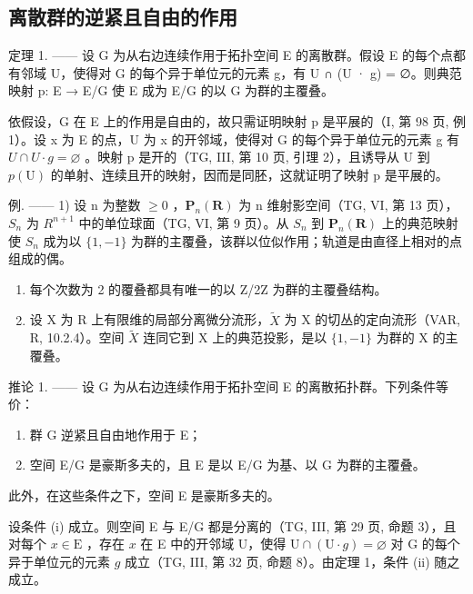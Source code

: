 \subsection{离散群的逆紧且自由的作用}

定理 1. —— 设 G 为从右边连续作用于拓扑空间 E 的离散群。假设 E 的每个点都有邻域 U，使得对 G 的每个异于单位元的元素 g，有 U ∩ (U · g) = ∅。则典范映射 p: E → E/G 使 E 成为 E/G 的以 G 为群的主覆叠。

依假设，G 在 E 上的作用是自由的，故只需证明映射 p 是平展的（I, 第 98 页, 例 1）。设 x 为 E 的点，U 为 x 的开邻域，使得对 G 的每个异于单位元的元素 g 有 \(U \cap U \cdot g = \varnothing\) 。映射 p 是开的（TG, III, 第 10 页, 引理 2），且诱导从 U 到 \(p(\mathrm{U})\) 的单射、连续且开的映射，因而是同胚，这就证明了映射 p 是平展的。

例. —— 1) 设 n 为整数 \(\geqslant 0\) ，\(\mathbf{P}_{n}(\mathbf{R})\) 为 n 维射影空间（TG, VI, 第 13 页），\(S_{n}\) 为 \(R^{n+1}\) 中的单位球面（TG, VI, 第 9 页）。从 \(S_{n}\) 到 \(\mathbf{P}_{n}(\mathbf{R})\) 上的典范映射使 \(S_{n}\) 成为以 \(\{1,-1\}\) 为群的主覆叠，该群以位似作用；轨道是由直径上相对的点组成的偶。

\begin{enumerate}
\def\labelenumi{\arabic{enumi})}
\setcounter{enumi}{1}
\item
  每个次数为 2 的覆叠都具有唯一的以 Z/2Z 为群的主覆叠结构。
\item
  设 X 为 R 上有限维的局部分离微分流形，\(\widetilde{X}\) 为 X 的切丛的定向流形（VAR, R, 10.2.4）。空间 \(\widetilde{X}\) 连同它到 X 上的典范投影，是以 \(\{1,-1\}\) 为群的 X 的主覆叠。
\end{enumerate}

推论 1. —— 设 G 为从右边连续作用于拓扑空间 E 的离散拓扑群。下列条件等价：

\begin{enumerate}
\def\labelenumi{(\roman{enumi})}
\item
  群 G 逆紧且自由地作用于 E；
\item
  空间 E/G 是豪斯多夫的，且 E 是以 E/G 为基、以 G 为群的主覆叠。
\end{enumerate}

此外，在这些条件之下，空间 E 是豪斯多夫的。

设条件 (i) 成立。则空间 E 与 E/G 都是分离的（TG, III, 第 29 页, 命题 3），且对每个 \(x \in \mathrm{E}\) ，存在 \(x\) 在 E 中的开邻域 U，使得 \(\mathrm{U} \cap (\mathrm{U} \cdot g) = \varnothing\) 对 G 的每个异于单位元的元素 \(g\) 成立（TG, III, 第 32 页, 命题 8）。由定理 1，条件 (ii) 随之成立。

